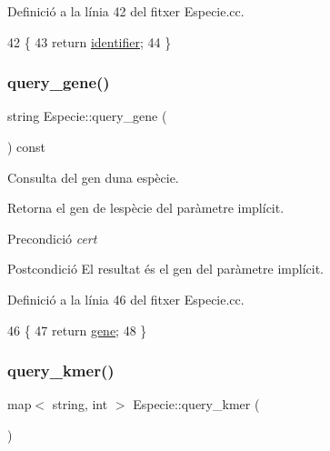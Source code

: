 Definició a la línia 42 del fitxer Especie.\+cc.


\begin{DoxyCode}
42                                       \{
43     \textcolor{keywordflow}{return} \hyperlink{class_especie_a2c63b7e3b74779e58feb0a2446faabd1}{identifier};
44 \}
\end{DoxyCode}
\mbox{\label{class_especie_a0781a594e45e036c0b59d161a7ebd8f3}} 
\subsubsection{\texorpdfstring{query\+\_\+gene()}{query\_gene()}}
{\footnotesize\ttfamily string Especie\+::query\+\_\+gene (\begin{DoxyParamCaption}{ }\end{DoxyParamCaption}) const}



Consulta del gen d\textquotesingle{}una espècie. 

Retorna el gen de l\textquotesingle{}espècie del paràmetre implícit.

\begin{DoxyPrecond}{Precondició}
{\itshape cert} 
\end{DoxyPrecond}
\begin{DoxyPostcond}{Postcondició}
El resultat és el gen del paràmetre implícit. 
\end{DoxyPostcond}


Definició a la línia 46 del fitxer Especie.\+cc.


\begin{DoxyCode}
46                                 \{
47     \textcolor{keywordflow}{return} \hyperlink{class_especie_affa45d2f858415333f43caf121c7663a}{gene};
48 \}
\end{DoxyCode}
\mbox{\label{class_especie_ab446000c51668cabe39fb2b72ed5fff0}} 
\subsubsection{\texorpdfstring{query\+\_\+kmer()}{query\_kmer()}}
{\footnotesize\ttfamily map$<$ string, int $>$ Especie\+::query\+\_\+kmer (\begin{DoxyParamCaption}{ }\end{DoxyParamCaption})}



